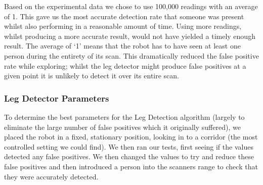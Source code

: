 \documentclass{article}
\begin{document}
	\begin{multicols}{2}
	Based on the experimental data we chose to use 100,000 readings with an average of 1. This gave us the most accurate detection rate that someone was present whilst also performing in a reasonable amount of time. Using more readings, whilst producing a more accurate result, would not have yielded a timely enough result. The average of ‘1’ means that the robot has to have seen at least one person during the entirety of its scan. This dramatically reduced the false positive rate while exploring; whilst the leg detector might produce false positives at a given point it is unlikely to detect it over its entire scan.

	\subsubsection{Leg Detector Parameters}
	To determine the best parameters for the Leg Detection algorithm (largely to eliminate the large number of false positives which it originally suffered), we placed the robot in a fixed, stationary position, looking in to a corridor (the most controlled setting we could find). We then ran our tests, first seeing if the values detected any false positives. We then changed the values to try and reduce these false positives and then introduced a person into the scanners range to check that they were accurately detected.
	\end{multicols}
\end{document}
